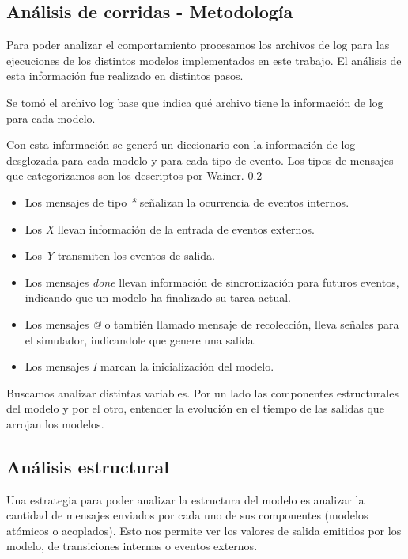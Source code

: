 
\subsection{Análisis de corridas - Metodología}

Para poder analizar el comportamiento procesamos los archivos de log para las ejecuciones de los distintos modelos implementados en este trabajo.
El análisis de esta información fue realizado en distintos pasos.

Se tomó el archivo log base que indica qué archivo tiene la información de log para cada modelo.

Con esta información se generó un diccionario con la información de log desglozada para cada modelo y para cada tipo de evento. Los tipos de mensajes que categorizamos son los descriptos por Wainer. \ref{}

\begin{itemize}
    \item Los mensajes de tipo \textit{*} señalizan la ocurrencia de eventos internos.
    \item Los \textit{X} llevan información de la entrada de eventos externos.
    \item Los \textit{Y} transmiten los eventos de salida.
    \item Los mensajes \textit{done} llevan información de sincronización para futuros eventos, indicando que un modelo ha finalizado su tarea actual.
    \item Los mensajes  \textit{@} o también llamado mensaje de recolección,
        lleva señales para el simulador, indicandole que genere una salida.
    \item Los mensajes \textit{I} marcan la inicialización del modelo.
\end{itemize}

Buscamos analizar distintas variables. Por un lado las componentes
estructurales del modelo y por el otro, entender la evolución en el tiempo de
las salidas que arrojan los modelos.

\subsection{Análisis estructural}
Una estrategia para poder analizar la estructura del modelo es analizar la
cantidad de mensajes enviados por cada uno de sus componentes (modelos atómicos o acoplados). 
Esto nos permite ver los valores de salida emitidos por los modelo, de transiciones internas o eventos
externos.

